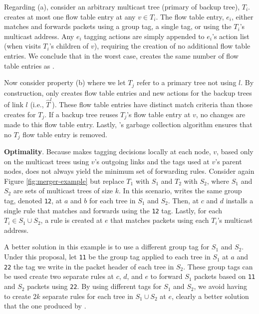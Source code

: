 Regarding (a), consider an arbitrary multicast tree (primary of backup tree), $T_i$. \merge creates at most one flow table entry at any $v \in T_i$.  
The flow table entry, $e_i$, either matches and forwards packets using a group tag, a single tag, or using the $T_i$'s multicast address.  Any $e_i$ tagging actions 
are simply appended to $e_i$'s action list (when \merge visits $T_i$'s children of $v$), requiring the creation of no additional flow table entries.  We conclude that in the worst case,
\merge creates the same number of flow table entries as \bases.  

Now consider property (b) where we let $T_j$ refer to a primary tree not using $l$. By construction, \merge only creates flow table entries and new actions for the backup trees of 
link $l$ (i.e., $\hat{T}^l$). These flow table entries have distinct match criteria than those \merge creates for $T_j$.  If a backup tree reuses $T_j$'s flow table entry at $v$, 
no changes are made to this flow table entry.  Lastly, \mdrs's garbage collection algorithm ensures that no $T_j$ flow table entry is removed.



{\bf Optimality}.  
Because \merge makes tagging decisions locally at each node, $v$, based only on the multicast trees using $v$'s outgoing links and the tags used at $v$'s parent nodes,
\merge does not always yield the minimum set of forwarding rules.
Consider again Figure \ref{fig:merger-example} but replace $T_1$ with $S_1$ and $T_2$ with $S_2$, where $S_1$ and $S_2$ are sets of multicast trees of size $k$.
In this scenario, \merge writes the same group tag, denoted {\tt 12}, at $a$ and $b$ for each tree in $S_1$ and $S_2$.  Then, at $c$ and $d$ \merge installs a single rule that matches and forwards 
using the {\tt 12} tag.  Lastly, for each $T_i \in S_1 \cup S_2$, a rule is created at $e$ that matches packets using each $T_i$'s multicast address.  %

A better solution in this example is to use a different group tag for $S_1$ and $S_2$.  Under this proposal, let {\tt 11} be the group tag applied to each tree in $S_1$ 
at $a$ and {\tt 22} the tag we write 
in the packet header of each tree in $S_2$.  These group tags can be used create two separate rules at $c$, $d$, and $e$ to forward $S_1$ packets based on {\tt 11} and $S_2$ packets using {\tt 22}.
By using different tags for $S_1$ and $S_2$, we avoid having to create $2k$ separate rules for each tree in $S_1 \cup S_2$ at $e$, clearly a better solution that the 
one produced by \merges. 

